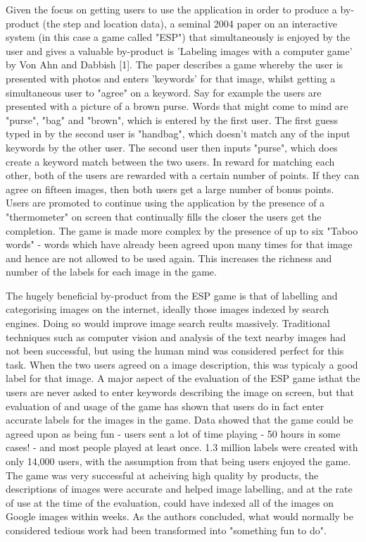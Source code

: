 \documentclass{l4proj}
\begin{document}
Given the focus on getting users to use the application in order to produce a by-product (the step and location data), a seminal 2004 paper on an interactive system (in this case a game called "ESP") that simultaneously is enjoyed by the user and gives a valuable by-product is 'Labeling images with a computer game' by Von Ahn and Dabbish [1]. The paper describes a game whereby the user is presented with photos and enters 'keywords' for that image, whilst getting a simultaneous user to "agree" on a keyword. Say for example the users are presented with a picture of a brown purse. Words that might come to mind are "purse", "bag" and "brown", which is entered by the first user. The first guess typed in by the second user is "handbag", which doesn't match any of the input keywords by the other user. The second user then inputs "purse", which does create a keyword match between the two users. In reward for matching each other, both of the users are rewarded with a certain number of points. If they can agree on fifteen images, then both users get a large number of bonus points. Users are promoted to continue using the application by the presence of a "thermometer" on screen that continually fills the closer the users get the completion. The game is made more complex by the presence of up to six "Taboo words" - words which have already been agreed upon many times for that image and hence are not allowed to be used again. This increases the richness and number of the labels for each image in the game.

The hugely beneficial by-product from the ESP game is that of labelling and categorising images on the internet, ideally those images indexed by search engines. Doing so would improve image search reults massively. Traditional techniques such as computer vision and analysis of the text nearby images had not been successful, but using the human mind was considered perfect for this task. When the two users agreed on a image description, this was typicaly a good label for that image. A major aspect of the evaluation of the ESP game isthat the users are never asked to enter keywords describing the image on screen, but that evaluation of and usage of the game has shown that users do in fact enter accurate labels for the images in the game. Data showed that the game could be agreed upon as being fun - users sent a lot of time playing - 50 hours in some cases! - and most people played at least once. 1.3 million labels were created with only 14,000 users, with the assumption from that being users enjoyed the game. The game was very successful at acheiving high quality by products, the descriptions of images were accurate and helped image labelling, and at the rate of use at the time of the evaluation, could have indexed all of the images on Google images within weeks. As the authors concluded, what would normally be considered tedious work had been transformed into "something fun to do".
\end{document}
